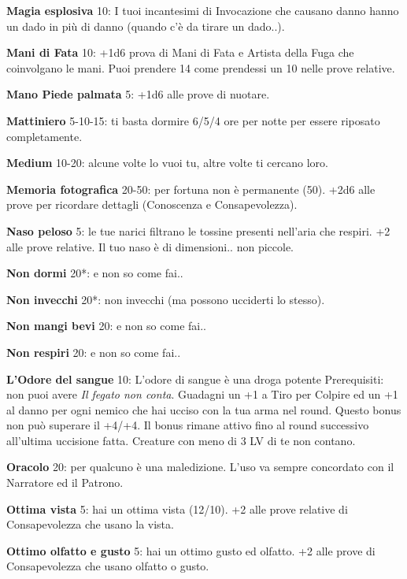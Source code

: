 \documentclass[a4paper,twoside,openany]{book}
\begin{document}
\begin{multicols}{2}
\textbf{Magia esplosiva} 10: I tuoi incantesimi di Invocazione che causano danno hanno un dado in più di danno (quando c'è da tirare un dado..).

\textbf{Mani di Fata} 10: +1d6 prova di Mani di Fata e Artista della Fuga che coinvolgano le mani. Puoi prendere 14 come prendessi un 10 nelle prove relative.

\textbf{Mano Piede palmata} 5: +1d6 alle prove di nuotare.

\textbf{Mattiniero} 5-10-15: ti basta dormire 6/5/4 ore per notte per essere riposato completamente.

\textbf{Medium} 10-20: alcune volte lo vuoi tu, altre volte ti cercano loro.

\textbf{Memoria fotografica} 20-50: per fortuna non è permanente (50). +2d6 alle prove per ricordare dettagli (Conoscenza e Consapevolezza).

\textbf{Naso peloso} 5: le tue narici filtrano le tossine presenti nell'aria che respiri. +2 alle prove relative. Il tuo naso è di dimensioni.. non piccole.

\textbf{Non dormi} 20{*}: e non so come fai..

\textbf{Non invecchi} 20{*}: non invecchi (ma possono ucciderti lo stesso).

\textbf{Non mangi bevi} 20: e non so come fai..

\textbf{Non respiri} 20: e non so come fai..

\textbf{L'Odore del sangue} 10: L'odore di sangue è una droga potente
Prerequisiti: non puoi avere \emph{Il fegato non conta}. Guadagni un +1 a Tiro per Colpire ed un +1 al danno per ogni nemico che hai ucciso con la tua arma nel round. Questo bonus non può superare il +4/+4. Il bonus rimane attivo fino al round successivo all'ultima uccisione fatta. Creature con meno di 3 LV di te non contano.

\textbf{Oracolo} 20: per qualcuno è una maledizione. L'uso va sempre concordato con il Narratore ed il Patrono.

\textbf{Ottima vista} 5: hai un ottima vista (12/10). +2 alle prove relative di Consapevolezza che usano la vista.

\textbf{Ottimo olfatto e gusto} 5: hai un ottimo gusto ed olfatto. +2 alle prove di Consapevolezza che usano olfatto o gusto.


\end{multicols}
\end{document}

